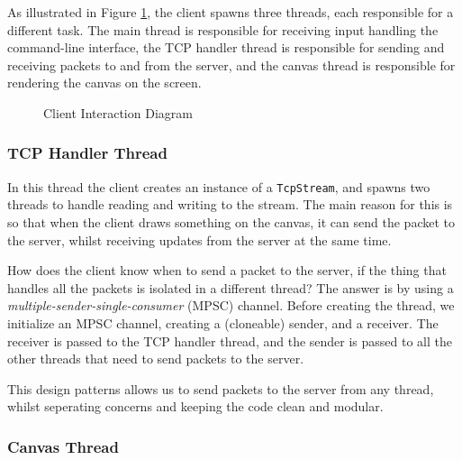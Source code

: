\documentclass{article}
\newcommand{\code}[1]{\texttt{#1}}
\begin{document}
As illustrated in Figure \ref{fig:interaction_diagram}, the client spawns three
threads, each responsible for a different task. The main thread is responsible
for receiving input handling the command-line interface, the TCP
handler thread is responsible for sending and receiving packets to and from the
server, and the canvas thread is responsible for rendering the canvas on the
screen.

\begin{figure}[!htb]
    \centering
    \caption{Client Interaction Diagram}
    \label{fig:interaction_diagram}
\end{figure}

\subsubsection{TCP Handler Thread}

In this thread the client creates an instance of a \code{TcpStream}, and spawns
two threads to handle reading and writing to the stream. The main reason for
this is so that when the client draws something on the canvas, it can send the
packet to the server, whilst receiving updates from the server at the same time.

How does the client know when to send a packet to the server, if the thing that
handles all the packets is isolated in a different thread? The answer is by using a
\textit{multiple-sender-single-consumer} (MPSC) channel. Before creating the thread, we
initialize an MPSC channel, creating a (cloneable) sender, and a receiver. The
receiver is passed to the TCP handler thread, and the sender is passed to all
the other threads that need to send packets to the server.

This design patterns allows us to send packets to the server from any thread,
whilst seperating concerns and keeping the code clean and modular.

\subsubsection{Canvas Thread}
\end{document}
